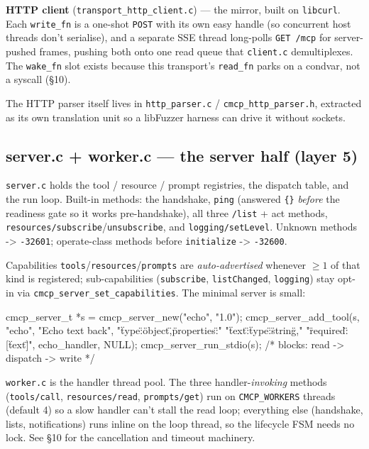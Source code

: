 \documentclass[10pt]{article}
\newcommand{\code}[1]{\texttt{\small #1}}
\begin{document}
\textbf{HTTP client} (\code{transport\_http\_client.c}) --- the mirror, built on
\code{libcurl}. Each \code{write\_fn} is a one-shot \code{POST} with its own easy
handle (so concurrent host threads don't serialise), and a separate SSE thread
long-polls \code{GET /mcp} for server-pushed frames, pushing both onto one read
queue that \code{client.c} demultiplexes. The \code{wake\_fn} slot exists because
this transport's \code{read\_fn} parks on a condvar, not a syscall (\S10).

The HTTP parser itself lives in \code{http\_parser.c} / \code{cmcp\_http\_parser.h},
extracted as its own translation unit so a libFuzzer harness can drive it without
sockets.

\subsection{server.c + worker.c --- the server half (layer 5)}

\code{server.c} holds the tool / resource / prompt registries, the dispatch
table, and the run loop. Built-in methods: the handshake, \code{ping} (answered
\code{\{\}} \emph{before} the readiness gate so it works pre-handshake), all three
\code{*/list} + act methods, \code{resources/subscribe}/\code{unsubscribe}, and
\code{logging/setLevel}. Unknown methods -> \code{-32601}; operate-class methods
before \code{initialize} -> \code{-32600}.

Capabilities \code{tools}/\code{resources}/\code{prompts} are
\emph{auto-advertised} whenever $\ge 1$ of that kind is registered;
sub-capabilities (\code{subscribe}, \code{listChanged}, \code{logging}) stay
opt-in via \code{cmcp\_server\_set\_capabilities}. The minimal server is small:

\begin{ccode}
cmcp_server_t *s = cmcp_server_new("echo", "1.0");
cmcp_server_add_tool(s, "echo", "Echo text back",
                     "{\"type\":\"object\",\"properties\":"
                     "{\"text\":{\"type\":\"string\"}},"
                     "\"required\":[\"text\"]}",
                     echo_handler, NULL);
cmcp_server_run_stdio(s);   /* blocks: read -> dispatch -> write */
\end{ccode}

\code{worker.c} is the handler thread pool. The three handler-\emph{invoking}
methods (\code{tools/call}, \code{resources/read}, \code{prompts/get}) run on
\code{CMCP\_WORKERS} threads (default 4) so a slow handler can't stall the read
loop; everything else (handshake, lists, notifications) runs inline on the loop
thread, so the lifecycle FSM needs no lock. See \S10 for the cancellation and
timeout machinery.
\end{document}

